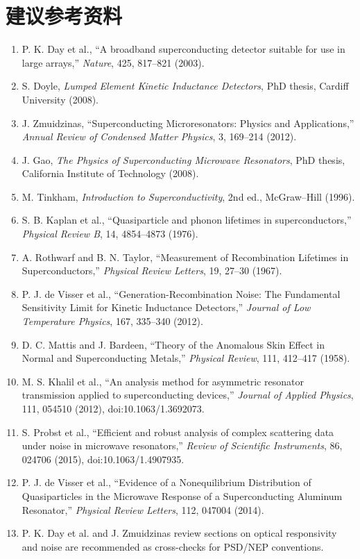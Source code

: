 \documentclass[11pt,a4paper,openany]{ctexrep}
\begin{document}
\chapter*{建议参考资料}
\begin{enumerate}
  \item P. K. Day et al., ``A broadband superconducting detector suitable for use in large arrays,'' \textit{Nature}, 425, 817--821 (2003).
  \item S. Doyle, \textit{Lumped Element Kinetic Inductance Detectors}, PhD thesis, Cardiff University (2008).
  \item J. Zmuidzinas, ``Superconducting Microresonators: Physics and Applications,'' \textit{Annual Review of Condensed Matter Physics}, 3, 169--214 (2012).
  \item J. Gao, \textit{The Physics of Superconducting Microwave Resonators}, PhD thesis, California Institute of Technology (2008).
  \item M. Tinkham, \textit{Introduction to Superconductivity}, 2nd ed., McGraw--Hill (1996).
  \item S. B. Kaplan et al., ``Quasiparticle and phonon lifetimes in superconductors,'' \textit{Physical Review B}, 14, 4854--4873 (1976).
  \item A. Rothwarf and B. N. Taylor, ``Measurement of Recombination Lifetimes in Superconductors,'' \textit{Physical Review Letters}, 19, 27--30 (1967).
  \item P. J. de Visser et al., ``Generation-Recombination Noise: The Fundamental Sensitivity Limit for Kinetic Inductance Detectors,'' \textit{Journal of Low Temperature Physics}, 167, 335--340 (2012).
  \item D. C. Mattis and J. Bardeen, ``Theory of the Anomalous Skin Effect in Normal and Superconducting Metals,'' \textit{Physical Review}, 111, 412--417 (1958).
  \item M. S. Khalil et al., ``An analysis method for asymmetric resonator transmission applied to superconducting devices,'' \textit{Journal of Applied Physics}, 111, 054510 (2012), doi:10.1063/1.3692073.
  \item S. Probst et al., ``Efficient and robust analysis of complex scattering data under noise in microwave resonators,'' \textit{Review of Scientific Instruments}, 86, 024706 (2015), doi:10.1063/1.4907935.
  \item P. J. de Visser et al., ``Evidence of a Nonequilibrium Distribution of Quasiparticles in the Microwave Response of a Superconducting Aluminum Resonator,'' \textit{Physical Review Letters}, 112, 047004 (2014).
  \item P. K. Day et al. and J. Zmuidzinas review sections on optical responsivity and noise are recommended as cross-checks for PSD/NEP conventions.
\end{enumerate}
\end{document}
